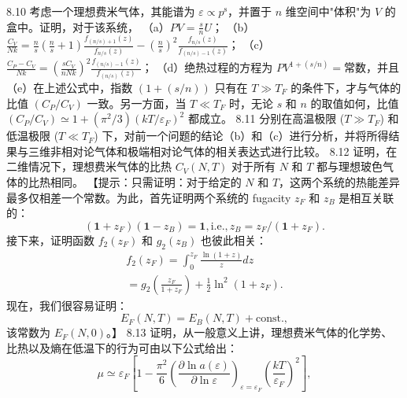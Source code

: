 8.10 考虑一个理想费米气体，其能谱为 \(\varepsilon \propto p^{\mathrm{s}}\)，并置于 \(n\) 维空间中"体积"为 \(V\) 的盒中。证明，对于该系统，
（a）\(PV=\frac{s}{n}U\)；
（b）\(\frac{C_V}{Nk}=\frac{n}{s}\left(\frac{n}{s}+1\right)\frac{f_{(n/s)+1}(z)}{f_{n/s}(z)}-\left(\frac{n}{s}\right)^2\frac{f_{n/s}(z)}{f_{(n/s)-1}(z)}\)；
（c）\(\frac{C_P-C_V}{Nk}=\left(\frac{sC_V}{nNk}\right)^2\frac{f_{(n/s)-1}(z)}{f_{(n/s)}(z)}\)；
（d）绝热过程的方程为 \(PV^{1+(s/n)}=\text{常数}\)，并且
（e）在上述公式中，指数 \((1+(s/n))\) 只有在 \(T \gg T_F\) 的条件下，才与气体的比值 \((C_P/C_V)\) 一致。另一方面，当 \(T \ll T_F\) 时，无论 \(s\) 和 \(n\) 的取值如何，比值 \((C_P/C_V) \simeq 1 + (\pi^2/3)(kT/\varepsilon_F)^2\) 都成立。
8.11 分别在高温极限 (\(T \gg T_F\)) 和低温极限 (\(T \ll T_F\)) 下，对前一个问题的结论（b）和（c）进行分析，并将所得结果与三维非相对论气体和极端相对论气体的相关表达式进行比较。
8.12 证明，在二维情况下，理想费米气体的比热 \(C_{V}(N,T)\) 对于所有 \(N\) 和 \(T\) 都与理想玻色气体的比热相同。
【提示：只需证明：对于给定的 \(N\) 和 \(T\)，这两个系统的热能差异最多仅相差一个常数。为此，首先证明两个系统的 fugacity \(z_{F}\) 和 \(z_{B}\) 是相互关联的：
\begin{equation}\tag{8.12.1}\label{eq:8.12.1}
( \mathbf { 1 } + z _ { F } ) ( \mathbf { 1 } - z _ { B } ) = \mathbf { 1 } ,  \mathrm { i . e . , }  z _ { B } = z _ { F } / ( \mathbf { 1 } + z _ { F } ) .
\end{equation}
接下来，证明函数 \(f_{2}(z_{F})\) 和 \(g_{2}(z_{B})\) 也彼此相关：
\begin{equation}\tag{8.12.2}\label{eq:8.12.2}
\begin{array}{r} { f _ { 2 } ( z _ { F } ) = \int _ { 0 } ^{z _ { F} } \frac { \ln ( 1 + z ) } { z } d z } \\{ = g _ { 2 } \left( \frac { z _ { F } } { 1 + z _ { F } } \right) + \frac { 1 } { 2 } \ln ^{2} ( 1 + z _ { F } ) . } \end{array}
\end{equation}
现在，我们很容易证明：
\begin{equation}\tag{8.12.3}\label{eq:8.12.3}
E _ { F } ( N , T ) = E _ { B } ( N , T ) + \mathrm { c o n s t . } ,
\end{equation}
该常数为 \(E_{F}(N,0)\)。】
8.13 证明，从一般意义上讲，理想费米气体的化学势、比热以及熵在低温下的行为可由以下公式给出：
\begin{equation}\tag{8.13.1}\label{eq:8.13.1}
\mu \simeq \varepsilon _ { F } \left[ 1 - \frac { \pi ^{2} } { 6 } \left( \frac { \partial \ln a ( \varepsilon ) } { \partial \ln \varepsilon } \right) _ { \varepsilon = \varepsilon _ { F } } \left( \frac { k T } { \varepsilon _ { F } } \right) ^{2} \right] ,
\end{equation}
